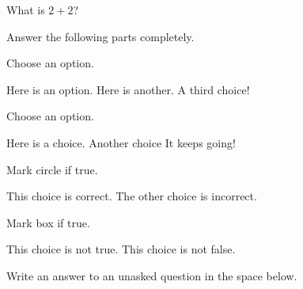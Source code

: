 \documentclass[12pt,letterpaper]{exam}
\begin{document}
\begin{questions}


\question[20] What is $2+2$?
\answer{1cm}


\newpage
\question Answer the following parts completely. \vspace{0.5cm}


\newpage
\question[1] Choose an option.
	\begin{choices}
	\choice Here is an option.
	\choice Here is another.
	\choice A third choice!
	\end{choices}


\vspace{3cm}
\question[1] Choose an option. \pspace
	\begin{oneparchoices}
	\choice Here is a choice.
	\choice Another choice
	\choice It keeps going!
	\end{oneparchoices}


\vspace{3cm}
\question[1] Mark circle if true.
	\begin{checkboxes}
	\choice This choice is correct.
	\choice The other choice is incorrect. 
	\end{checkboxes}


\vspace{3cm}
{
\checkboxchar{$\Box$}
\question[3] Mark box if true.
	\begin{checkboxes}
	\choice This choice is not true.
	\choice This choice is not false. 
	\end{checkboxes}
}


\newpage
\question[1] Write an answer to an unasked question in the space below.
\makeemptybox{2in} %



\end{questions}
\end{document}
